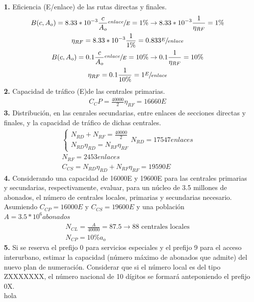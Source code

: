 \begin{exercise}[7]
\begin{itemize}
\end{itemize}
\textbf{1.} Eficiencia (E/enlace) de las rutas directas y finales.\\
\begin{gather*}
B(c,A_o)=8.33*10^{-3}\frac{c}{A_o}\sfrac{enlace}{E}=1\% \to 8.33*10^{-3}\frac{1}{\eta_{RF}}=1\% \\
\eta_{RF}=8.33*10^{-3}\frac{1}{1\%}=0.833\sfrac{E}{enlace}\\
B(c,A_o)=0.1\frac{c}{A_o}\sfrac{enlace}{E}=10\% \to 0.1\frac{1}{\eta_{RF}}=10\% \\
\eta_{RF}=0.1\frac{1}{10\%}=1\sfrac{E}{enlace}
\end{gather*}
\textbf{2.} Capacidad de tráfico (E)de las centrales primarias.\\
\begin{gather*}
C_CP=\frac{40000}{2}\eta_{RF}=16660E
\end{gather*}
\textbf{3.} Distribución, en las cenrales secundarias, entre enlaces de secciones directas y finales, y la capacidad de tráfico de dichas centrales.\\
\begin{gather*}
\begin{cases}
N_{RD}+N_{RF}=\frac{40000}{2}\\
N_{RD}\eta_{RD}=N_{RF}\eta_{RF}
\end{cases}
N_{RD}=17547enlaces\\
N_{RF}=2453enlaces\\
C_{CS}=N_{RD}\eta_{RD}+N_{RF}\eta_{RF}=19590E
\end{gather*}
\textbf{4.} Considerando una capacidad de 16000E y 19600E para las centrales primarias y secundarias, respectivamente, evaluar, para un núcleo de 3.5 millones de abonados, el número de centrales locales, primarias y secundarias necesario.\\
Asumiendo $C_{CP}=16000E$ y $C_{CS}=19600E$ y una población $A=3.5*10^6abonados$
\begin{gather*}
N_{CL}=\frac{A}{40000}=87.5\to88\text{ centrales locales}\\
N_{CP}=10\% a_o
\end{gather*}
\textbf{5.} Si se reserva el prefijo 0 para servicios especiales y el prefijo 9 para el acceso interurbano, estimar la capacidad (número máximo de abonados que admite) del nuevo plan de numeración. Considerar que si el número local es del tipo ZXXXXXXX, el número nacional de 10 dígitos se formará anteponiendo el prefijo 0X.\\
hola
\end{exercise}
